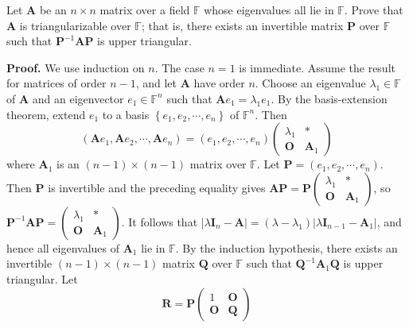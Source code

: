 \documentclass[12pt, a4paper, oneside]{book}
\begin{document}
\begin{theorem}
    Let $\mathbf{A}$ be an $n \times n$ matrix over a field $\mathbb{F}$ whose eigenvalues all lie in $\mathbb{F}$. Prove that $\mathbf{A}$ is triangularizable over $\mathbb{F}$; that is, there exists an invertible matrix $\mathbf{P}$ over $\mathbb{F}$ such that $\mathbf{P}^{-1} \mathbf{A} \mathbf{P}$ is upper triangular.

    \textbf{Proof.}
    We use induction on $n$. The case $n=1$ is immediate. Assume the result for matrices of order $n-1$, and let $\mathbf{A}$ have order $n$. Choose an eigenvalue $\lambda_1 \in \mathbb{F}$ of $\mathbf{A}$ and an eigenvector $e_1 \in \mathbb{F}^n$ such that $\mathbf{A} e_1=\lambda_1 e_1$. By the basis-extension theorem, extend $e_1$ to a basis
    $\left\{{e}_1, {e}_2, \cdots, {e}_n\right\}$ of $\mathbb{F}^n$. Then
    \[
        \left(\mathbf{A} e_1, \mathbf{A} e_2, \cdots, \mathbf{A} e_n\right)=\left(e_1, e_2, \cdots, e_n\right)\left(\begin{array}{cc}
                \lambda_1  & *            \\
                \mathbf{O} & \mathbf{A}_1
            \end{array}\right)
    \]
    where $\mathbf{A}_1$ is an $(n-1) \times (n-1)$ matrix over $\mathbb{F}$. Let $\mathbf{P}=\left({e}_1, {e}_2, \cdots, {e}_n\right)$. Then $\mathbf{P}$ is invertible and the preceding equality gives ${\mathbf{A} \mathbf{P}}=\mathbf{P}\left(\begin{array}{cc}\lambda_1 & * \\ \mathbf{O} & \mathbf{A}_1\end{array}\right)$, so $\mathbf{P}^{-1} {\mathbf{A} \mathbf{P}}=\left(\begin{array}{cc}\lambda_1 & * \\ \mathbf{O} & \mathbf{A}_1\end{array}\right)$. It follows that $\left|\lambda \mathbf{I}_n-\mathbf{A}\right|=\left(\lambda-\lambda_1\right)\left|\lambda \mathbf{I}_{n-1}-\mathbf{A}_1\right|$, and hence all eigenvalues of $\mathbf{A}_1$ lie in $\mathbb{F}$. By the induction hypothesis, there exists an invertible $(n-1) \times (n-1)$ matrix $\mathbf{Q}$ over $\mathbb{F}$ such that $\mathbf{Q}^{-1} \mathbf{A}_1 \mathbf{Q}$ is upper triangular. Let
    \[
        \mathbf{R}=\mathbf{P}\left(\begin{array}{ll}
                1          & \mathbf{O} \\
                \mathbf{O} & \mathbf{Q}
            \end{array}\right)
\]
\end{theorem}
\end{document}

